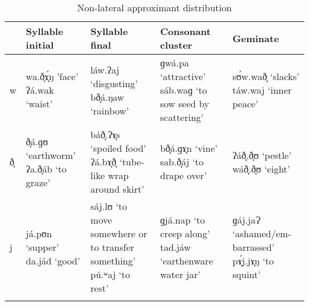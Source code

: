 \begin{table}
\caption{Non-lateral approximant distribution}
\label{tab2.6}
\begin{tabularx}{\textwidth}{lQQQQ}
\lsptoprule
& Syllable initial & Syllable final & Consonant cluster & Geminate \\
\midrule
w & wa.ð̞ɤ̞́ŋ ’face’
\newline
ʔá.wak \newline ‘waist’ &
láw.ʔaj \newline ‘disgusting’
\newline
bð̞á.ŋaw \newline ‘rainbow’ &
ɡwá.pa \newline ‘attractive’
\newline
sáb.waɡ \newline ‘to sow seed by scattering' &
sʊ́w.wað̞ \newline ‘slacks’
\newline
táw.waj \newline ‘inner peace’ \\
\tablevspace
ð̞ & ð̞á.ɡʊ \newline ‘earthworm’
\newline
ʔa.ð̞áb \newline ‘to graze’ &
báð̞.ʔɤ̞s \newline ‘spoiled food’
\newline
ʔá.bɤ̞ð̞ \newline ‘tube-like wrap around skirt’ &
bð̞á.ɡɤ̞n \newline ‘vine’
\newline
sab.ð̞áj \newline ‘to drape over’ &
ʔáð̞.ð̞ʊ \newline ‘pestle’
\newline
wáð̞.ð̞ʊ \newline ‘eight’ \\
\tablevspace
j & já.pʊn \newline ‘supper’
\newline
da.jád \newline ‘good’ &
sáj.lʊ \newline ‘to move somewhere or to transfer something’
\newline
pú.ʷaj \newline ‘to rest’ &
ɡjá.nap \newline ‘to creep along’
\newline
tad.jáw \newline ‘earthenware water jar’ &
ɡáj.jaɁ \newline ‘ashamed/em-barrassed’
\newline
pɤ̞́j.jɤ̞ŋ \newline ‘to squint’ \\
\lspbottomrule
\end{tabularx}
\end{table}

